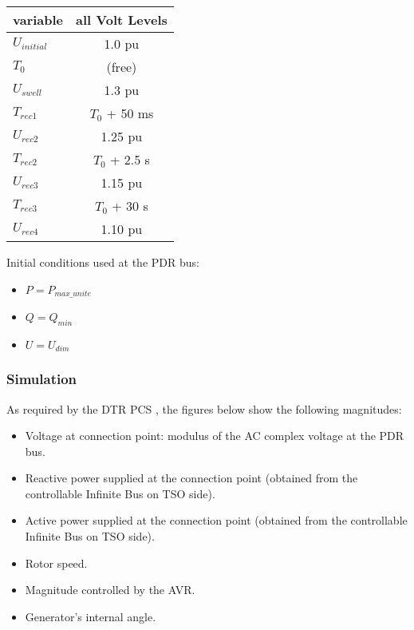     \begin{center}
        \begin{tabular}{lc}
            \toprule
            \textbf{variable} & \textbf{all Volt Levels} \\
            \midrule
            $U_{initial}$     & 1.0 pu                   \\
            $T_{0}$           & (free)                   \\
            $U_{swell}$       & 1.3 pu                   \\
            $T_{rec1}$        & $T_{0}$ + 50 ms          \\
            $U_{rec2}$        & 1.25 pu                  \\
            $T_{rec2}$        & $T_{0}$ + 2.5 s          \\
            $U_{rec3}$        & 1.15 pu                  \\
            $T_{rec3}$        & $T_{0}$ + 30 s           \\
            $U_{rec4}$        & 1.10 pu                  \\
            \bottomrule
        \end{tabular}
    \end{center}

    \begin{description}
        \item Initial conditions used at the PDR bus:
        \begin{itemize}
            \item  $P = P_{max\_unite}$
            \item $Q = Q_{min}$
            \item $U = U_{dim}$
        \end{itemize}
    \end{description}


    \subsubsection{Simulation}
    As required by the DTR PCS \DTRPcs, the figures below show the
    following magnitudes:
    \begin{itemize}
        \item Voltage at connection point: modulus of the AC complex voltage at
        the PDR bus.
        \item Reactive power supplied at the connection point (obtained from
        the controllable Infinite Bus on TSO side).
        \item Active power supplied at the connection point (obtained from
        the controllable Infinite Bus on TSO side).
        \item Rotor speed.
        \item Magnitude controlled by the AVR.
        \item Generator's internal angle.
    \end{itemize}

